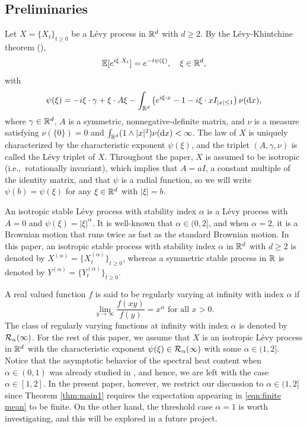 \documentclass[11pt]{article}
\begin{document}
\begin{doublespace}
\section{Preliminaries}\label{section:preliminaries}
Let $X=\{X_{t}\}_{t\geq 0}$ be a L\'evy process in ${\mathbb R}^d$ with $d\ge 2$.
By the L\'evy-Khintchine theorem (\cite[Theorem 8.1]{Sato}), 
\[
{\mathbb E}[e^{i\xi \cdot X_{t}}]=e^{-t\psi(\xi)}, \quad \xi\in{\mathbb R}^{d},
\]
with
\[
\psi(\xi)=-i \xi\cdot \gamma + \xi \cdot A\xi -\int_{{\mathbb R}^{d}}\left(e^{i \xi \cdot x}-1-i \xi \cdot x I_{|x|\le 1} \right)\nu(\mathrm{d} x),
\]
where $\gamma\in{\mathbb R}^{d}$, $A$ is a symmetric, nonnegative-definite matrix, and $\nu$ is a measure satisfying $\nu(\{0\})=0$ and $\int_{{\mathbb R}^d}(1\wedge |x|^2)\nu(\mathrm{d} x)<\infty$.
The law of $X$ is uniquely characterized by the characteristic exponent $\psi(\xi)$, and the triplet $(A,\gamma,\nu)$ is called the L\'evy triplet of $X$. 
Throughout the paper, $X$ is assumed to be isotropic (i.e.,\ rotationally invariant), which implies that $A=aI$, a constant multiple of the identity matrix, and that $\psi$ is a radial function, so we will write $\psi(b)=\psi(\xi)$ for any $\xi\in {\mathbb R}^{d}$ with $|\xi|=b$.


An isotropic stable L\'evy process with stability index $\alpha$ is a L\'evy process with $A=0$ and $\psi(\xi)=|\xi|^{\alpha}$. 
It is well-known that $\alpha\in (0,2]$, and when $\alpha=2$, it is a Brownian motion that runs twice as fast as the standard Brownian motion. 
In this paper, an isotropic stable process with stability index $\alpha$ in ${\mathbb R}^d$ with $d\ge 2$ is denoted by $X^{(\alpha)}=\{X_{t}^{(\alpha)}\}_{t\geq 0}$, whereas a symmetric stable process in ${\mathbb R}$ is denoted by $Y^{(\alpha)}=\{Y_{t}^{(\alpha)}\}_{t\geq 0}$. 

A real valued function $f$ is said to be regularly varying at infinity with index $\alpha$ if 
\[
\lim_{y\to\infty}\frac{f(xy)}{f(y)}=x^{\alpha} \text{ for all } x>0.
\]
The class of regularly varying functions at infinity with index $\alpha$ is denoted by ${\mathcal R}_{\alpha}(\infty)$.
For the rest of this paper, we assume that $X$ is an isotropic L\'evy process in ${\mathbb R}^{d}$ with the characteristic exponent $\psi(\xi)\in {\mathcal R}_{\alpha}(\infty)$ with some $\alpha\in (1,2]$.
Notice that the asymptotic behavior of the spectral heat content when $\alpha\in (0,1)$ was already studied in \cite{GPS19}, and hence, we are left with the case $\alpha\in [1,2]$. In the present paper, however, we restrict our discussion to $\alpha\in (1,2]$ since Theorem \ref{thm:main1} requires the expectation appearing in \eqref{eqn:finite mean} to be finite. On the other hand, the threshold case $\alpha=1$ is worth investigating, and this will be explored in a future project.


\end{doublespace}
\end{document}
